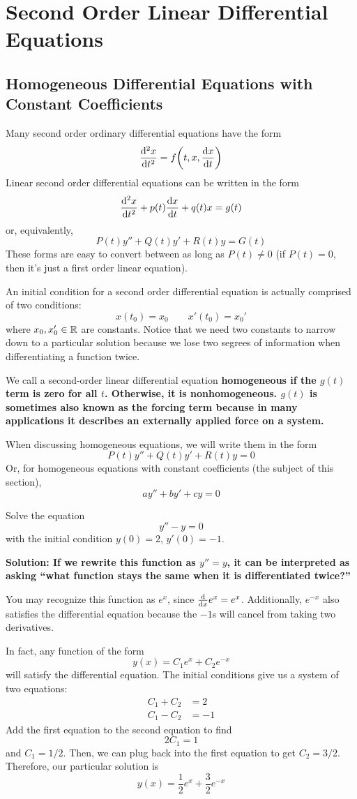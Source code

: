 \section{Second Order Linear Differential Equations}
\subsection{Homogeneous Differential Equations with Constant Coefficients}
Many second order ordinary differential equations have the form
\[ \dv[2]{x}{t} = f\pqty{t, x, \dv{x}{t}} \]
Linear second order differential equations can be written in the form
\[ \dv[2]{x}{t} + p(t)\dv{x}{t} + q(t)x = g(t) \]
or, equivalently,
\[ P(t)y'' + Q(t)y' + R(t)y = G(t)\]
These forms are easy to convert between as long as $P(t) \neq 0$ (if $P(t) = 0$, then it's just a first order linear equation). \par
An initial condition for a second order differential equation is actually comprised of two conditions:
\[ x(t_0) = x_0 \quad\quad x'(t_0) = x_0' \]
where $x_0, x_0' \in \mathbb{R}$ are constants. Notice that we need two constants to narrow down to a particular solution because we lose two segrees of information when differentiating a function twice. \par
We call a second-order linear differential equation \bf{homogeneous} if the $g(t)$ term is zero for all $t$. Otherwise, it is \bf{nonhomogeneous}. $g(t)$ is sometimes also known as the \bf{forcing term} because in many applications it describes an externally applied force on a system. \par
When discussing homogeneous equations, we will write them in the form
\[ P(t)y'' + Q(t)y' + R(t)y = 0 \]
Or, for homogeneous equations with constant coefficients (the subject of this section),
\[ ay'' + by' + cy = 0 \]
\begin{example}
    Solve the equation 
    \[ y'' - y = 0 \]
    with the initial condition $y(0) = 2$, $y'(0) = -1$. \par
    \bf{Solution:} If we rewrite this function as $y'' = y$, it can be interpreted as asking ``what function stays the same when it is differentiated twice?'' \par
    You may recognize this function as $e^x$, since $\dv{x} e^x = e^x$. Additionally, $e^{-x}$ also satisfies the differential equation because the $-1$s will cancel from taking two derivatives. \par
    In fact, any function of the form
    \[y(x) = C_1e^x + C_2e^{-x} \]
    will satisfy the differential equation. The initial conditions give us a system of two equations:
    \begin{align*}
        C_1 + C_2 &= 2\\
        C_1 - C_2 &= -1
    \end{align*} 
    Add the first equation to the second equation to find
    \[ 2C_1 = 1 \]
    and $C_1 = 1/2$. Then, we can plug back into the first equation to get $C_2 = 3/2$. Therefore, our particular solution is
    \[ y(x) = \frac{1}{2}e^x + \frac{3}{2}e^{-x}\]
\end{example}
